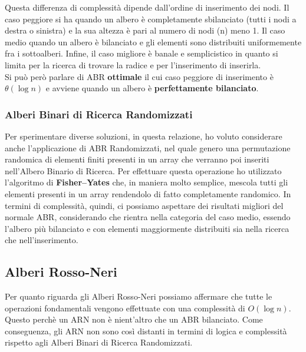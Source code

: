 \documentclass{article}
\begin{document}
Questa differenza di complessità dipende dall'ordine di inserimento dei nodi.
Il caso peggiore si ha quando un albero è completamente sbilanciato (tutti i nodi a destra o sinistra) e la sua altezza è pari al numero di nodi (n) meno 1.
Il caso medio quando un albero è bilanciato e gli elementi sono distribuiti uniformemente fra
i sottoalberi.
Infine, il caso migliore è banale e semplicistico in quanto si limita per la ricerca di trovare la radice e per l'inserimento di inserirla.\\
Si può però parlare di ABR \textbf{ottimale} il cui caso peggiore di inserimento è $\theta{(\log{n})}$ e avviene quando un albero è \textbf{perfettamente bilanciato}.
\subsubsection{Alberi Binari di Ricerca Randomizzati}
Per sperimentare diverse soluzioni, in questa relazione, ho voluto considerare anche l'applicazione di ABR Randomizzati, nel quale genero una permutazione randomica di elementi finiti presenti in un array che verranno poi inseriti nell'Albero Binario di Ricerca.
Per effettuare questa operazione ho utilizzato l'algoritmo di \textbf{Fisher–Yates} che, in maniera molto semplice, mescola tutti gli elementi presenti in un array rendendolo di fatto completamente randomico.
In termini di complessità, quindi, ci possiamo aspettare dei risultati migliori del normale ABR, considerando che rientra nella categoria del caso medio, essendo l'albero più bilanciato e con elementi maggiormente distribuiti sia nella ricerca che nell'inserimento.
\subsection{Alberi Rosso-Neri}
Per quanto riguarda gli Alberi Rosso-Neri possiamo affermare che tutte le operazioni fondamentali vengono effettuate con una complessità di $O(\log{n})$.
Questo perchè un ARN non è nient'altro che un ABR bilanciato.
Come conseguenza, gli ARN non sono così distanti in termini di logica e complessità rispetto agli Alberi Binari di Ricerca Randomizzati.

\clearpage

\end{document}
